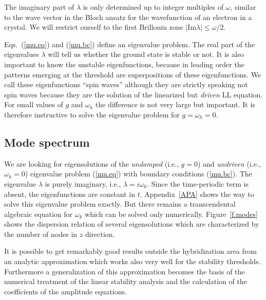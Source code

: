 The imaginary part of $\lambda$ is only determined up to integer
multiples of $\omega$, similar to the wave vector in the Bloch ansatz
for the wavefunction of an electron in a crystal. We will restrict
ourself to the first Brillouin zone $|\mbox{Im}\lambda|\le\omega/2$. 

Eqs.~(\ref{mu.eq}) and (\ref{mu.bc}) define an eigenvalue problem.
The real part of the eigenvalues $\lambda$ will tell us whether the
ground state is stable or not. It is also important to know the
unstable eigenfunctions, because in leading order the patterns
emerging at the threshold are superpositions of these eigenfunctions.
We call these eigenfunctions ``spin waves'' although they are
strictly speaking not spin waves because they are the solution of the
linearized but {\em driven\/} LL equation. For small values of $g$
and $\omega_h$ the difference is not very large but important.  It is
therefore instructive to solve the eigenvalue problem for
$g=\omega_h=0$. 

\subsection{\protect\label{LINM}Mode spectrum}

We are looking for eigensolutions of the {\em undamped\/} (i.e.,
$g=0$) and {\em undriven\/} (i.e., $\omega_h=0$) eigenvalue problem
(\ref{mu.eq}) with boundary conditions (\ref{mu.bc}). The eigenvalue
$\lambda$ is purely imaginary, i.e., $\lambda=i\omega_k$. Since the
time-periodic term is absent, the eigenfunctions are constant in $t$.
Appendix~\ref{APA} shows the way to solve this eigenvalue problem
exactly. But there remains a transcendental algebraic equation for 
$\omega_k$ which can be solved only numerically. Figure~\ref{f.modes}
shows the dispersion relation of several eigensolutions which are
characterized by the number of nodes in $z$ direction. 

It is possible to get remarkably good results outside the
hybridization area from an analytic approximation which works also
very well for the stability thresholds. Furthermore a generalization
of this approximation becomes the basis of the numerical treatment of
the linear stability analysis and the calculation of the coefficients
of the amplitude equations.

